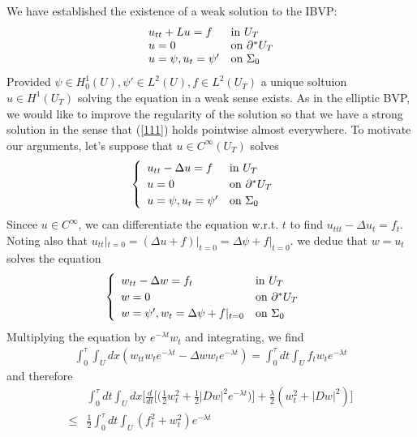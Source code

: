 \documentclass[12pt,a4paper]{report}
\begin{document}
We have established the existence of a weak solution to the IBVP:
\begin{align}
\begin{array}{ll}
u_{tt}+Lu =f & \text{in }U_T\\
u=0 & \text{on } \partial^* U_T\\
u=\psi, u_t =\psi' & \text{on }\Sigma_0
\end{array} \label{111}
\end{align}
Provided $\psi\in H_0^1 (U), \psi'\in L^2(U), f\in L^2(U_T)$ a unique soltuion $u\in H^1(U_T)$ solving the equation in a weak sense exists. As in the elliptic BVP, we would like to improve the regularity of the solution so that we have a strong solution in the sense that (\ref{111}) holds pointwise almost everywhere. To motivate our arguments, let's suppose that $u\in C^{\infty}(U_T)$ solves
\begin{align*}
\begin{cases}
\begin{array}{ll}
u_{tt}-\Delta u =f & \text{in }U_T\\
u=0& \text{on } \partial^* U_T\\
u=\psi, u_t =\psi' & \text{on }\Sigma_0
\end{array}
\end{cases}
\end{align*} 
Sincee $u\in C^{\infty}$, we can differentiate the equation w.r.t. $t$ to find $u_{ttt}-\Delta u_t = f_t$. Noting also that $u_{tt}|_{t=0} = (\Delta u + f)|_{t=0} = \Delta \psi + f|_{t=0}$. we dedue that $w= u_t$ solves the equation
\begin{align*}
\begin{cases}
\begin{array}{ll}
w_{tt} - \Delta w =f_t & \text{in }U_T\\
w=0& \text{on } \partial^* U_T\\
w=\psi', w_t =\Delta \psi + f|_{t=0} & \text{on }\Sigma_0
\end{array}
\end{cases}
\end{align*}
Multiplying the equation by $e^{-\lambda t}w_t$ and integrating, we find
\begin{align*}
\int_0^{\tau} \int_U dx (w_{tt}w_t e^{-\lambda t}- \Delta w w_t e^{-\lambda t})= \int_0^{\tau} dt\int_U f_t w_t e^{-\lambda t}
\end{align*}
and therefore
\begin{align*}
& \int_0^{\tau}dt \int_U dx \Big[  \frac{d}{dt}\Big[ \Big( \frac{1}{2}w_t^2 + \frac{1}{2}|Dw|^2 e^{-\lambda t} \Big)  \Big] + \frac{\lambda}{2}(w_t^2 + |Dw|^2)\Big]\\
\leq & \frac{1}{2}\int_0^{\tau}dt \int_U (f_t^2+w_t^2)e^{-\lambda t}
\end{align*}
\end{document}
